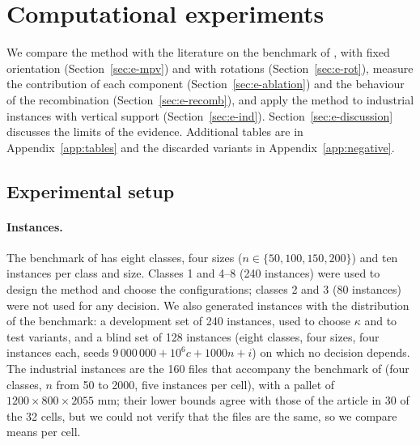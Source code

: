 \providecommand{\pend}[1]{\textcolor{red}{[PENDING: #1]}}

\section{Computational experiments}
\label{sec:experiments-bpp}

We compare the method with the literature on the benchmark of \citet{Martello2000}, with fixed orientation
(Section~\ref{sec:e-mpv}) and with rotations (Section~\ref{sec:e-rot}), measure the contribution of each component
(Section~\ref{sec:e-ablation}) and the behaviour of the recombination (Section~\ref{sec:e-recomb}), and apply the method
to industrial instances with vertical support (Section~\ref{sec:e-ind}). Section~\ref{sec:e-discussion} discusses the
limits of the evidence. Additional tables are in Appendix~\ref{app:tables} and the discarded variants in
Appendix~\ref{app:negative}.

\subsection{Experimental setup}
\label{sec:e-setup}

\paragraph{Instances.}
The benchmark of \citet{Martello2000} has eight classes, four sizes ($n\in\{50,100,150,200\}$) and ten instances per
class and size. Classes 1 and 4--8 (240 instances) were used to design the method and choose the configurations;
classes 2 and 3 (80 instances) were not used for any decision. We also generated instances with the distribution of
the benchmark: a development set of 240 instances, used to choose $\kappa$ and to test variants, and a blind set of 128
instances (eight classes, four sizes, four instances each, seeds $9\,000\,000+10^6c+1000n+i$) on which no decision
depends. The industrial instances are the 160 files that accompany the benchmark of \citet{Elhedhli2019} (four
classes, $n$ from 50 to 2000, five instances per cell), with a pallet of $1200\times 800\times 2055$ mm; their lower
bounds agree with those of the article in 30 of the 32 cells, but we could not verify that the files are the same, so
we compare means per cell.

